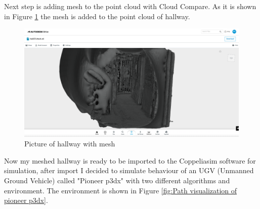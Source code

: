 \noindent Next step is adding mesh to the point cloud with Cloud Compare. As it is shown in Figure \ref{fig:Hallway with Mesh} the mesh is added to the point cloud of hallway.
\begin{figure}[H]
  \centering
  \includegraphics[width= 1.0\textwidth]{Figures/Meshhall.PNG}
  \caption[Picture of Meshed Hallway]{Picture of hallway with mesh}
  \label{fig:Hallway with Mesh}
\end{figure}
Now my meshed hallway is ready to be imported to the Coppeliasim software for simulation, after import I decided to simulate behaviour of an UGV (Unmanned Ground Vehicle) called "Pioneer p3dx" with two different algorithms and environment. The environment is shown in Figure
\ref{fig:Path visualization of pioneer p3dx}.

